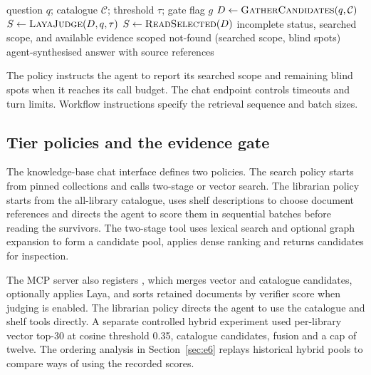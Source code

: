 \begin{algorithm}[t]
\caption{Tiered access with optional evidence gate}
\label{alg:tiered}
\begin{algorithmic}[1]
\Require question $q$; catalogue $\mathcal{C}$; threshold $\tau$; gate flag $g$
\State $D \gets \textsc{GatherCandidates}(q,\mathcal{C})$ 
  \State $S \gets \textsc{LayaJudge}(D,q,\tau)$ 
\Else
  \State $S \gets \textsc{ReadSelected}(D)$
\EndIf
{}
  \State \Return incomplete status, searched scope, and available evidence
  \State \Return scoped not-found (searched scope, blind spots)
\Else
  \State \Return agent-synthesised answer with source references
\EndIf
\end{algorithmic}
\end{algorithm}
The policy instructs the agent to report its searched scope and remaining
blind spots when it reaches its call budget. The chat endpoint controls
timeouts and turn limits. Workflow instructions specify the retrieval
sequence and batch sizes.

\subsection{Tier policies and the evidence gate}
\label{sec:trace}
\label{sec:gate}
\label{sec:gate-primitive}
\label{sec:twostage}

The knowledge-base chat interface defines two policies. The search policy
starts from pinned collections and calls two-stage or vector search. The
librarian policy starts from the all-library catalogue, uses shelf
descriptions to choose document references and directs the agent to score
them in sequential batches before reading the survivors. The two-stage
tool uses lexical search and optional graph expansion to form a candidate
pool, applies dense ranking and returns candidates for inspection.

The MCP server also registers , which merges vector
and catalogue candidates, optionally applies Laya, and sorts retained
documents by verifier score when judging is enabled. The librarian policy
directs the agent to use the catalogue and shelf tools directly. A separate
controlled hybrid experiment used per-library vector top-30 at cosine
threshold 0.35, catalogue candidates, fusion and a cap of twelve. The
ordering analysis in Section~\ref{sec:e6} replays historical hybrid pools
to compare ways of using the recorded scores.

